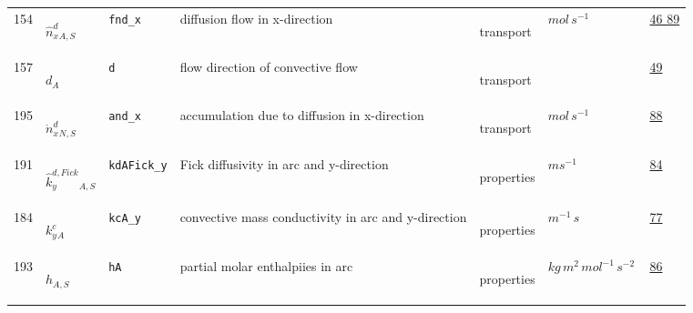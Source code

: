 \begin{longtable}{|p{1cm}|p{2.5cm}|p{4.5cm}|p{8cm}|p{3.0cm}|p{3cm}|p{1cm}|}
            154
             & \hypertarget{"v:154"}{ $ {{\hat{n}^{d}_x}}{_{A, S}} $}
             & \verb|fnd_x|
             & diffusion flow in x-direction
             & \begin{lay}transport \end{lay}
             & $ mol \,s^{-1} \, $
             &                 \hyperlink{"e:46"}{ 46 }
                                 \hyperlink{"e:89"}{ 89 }
                 \\
            157
             & \hypertarget{"v:157"}{ $ {d}{_{A}} $}
             & \verb|d|
             & flow direction of convective flow
             & \begin{lay}transport \end{lay}
             & $  $
             &                 \hyperlink{"e:49"}{ 49 }
                 \\
            195
             & \hypertarget{"v:195"}{ $ {{\dot{n}^d_x}}{_{N, S}} $}
             & \verb|and_x|
             & accumulation due to diffusion in x-direction
             & \begin{lay}transport \end{lay}
             & $ mol \,s^{-1} \, $
             &                 \hyperlink{"e:88"}{ 88 }
                 \\
            191
             & \hypertarget{"v:191"}{ $ {{\hat{k}^{d,Fick}_y}}{_{A, S}} $}
             & \verb|kdAFick_y|
             & Fick diffusivity in arc and y-direction
             & \begin{lay}properties \end{lay}
             & $ m s^{-1} \, $
             &                 \hyperlink{"e:84"}{ 84 }
                 \\
            184
             & \hypertarget{"v:184"}{ $ {{k^c_y}}{_{A}} $}
             & \verb|kcA_y|
             & convective mass conductivity in arc and y-direction
             & \begin{lay}properties \end{lay}
             & $ m^{-1} \,s \, $
             &                 \hyperlink{"e:77"}{ 77 }
                 \\
            193
             & \hypertarget{"v:193"}{ $ {h}{_{A, S}} $}
             & \verb|hA|
             & partial molar enthalpiies in arc
             & \begin{lay}properties \end{lay}
             & $ kg \,m^{2} \,mol^{-1} \,s^{-2} \, $
             &                 \hyperlink{"e:86"}{ 86 }

\end{longtable}
